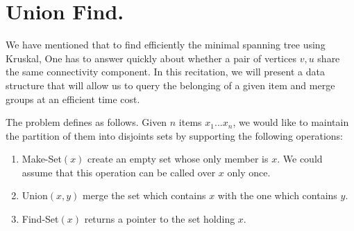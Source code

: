   \pagestyle{empty}

  \setlength{\textwidth}{6.5in}
  \setlength{\evensidemargin}{0.0in}
  \setlength{\oddsidemargin}{0.0in}
  \setlength{\topmargin}{-0.25in}
  \setlength{\textheight}{9.0in}
  \setlength{\baselineskip}{1.3\baselineskip}
  \setlength{\parindent}{.0in}
\fi
{}

\def\LinkedList#1{%
  \foreach \element in \list {
    \node[node of list, right = of aux, name=ele] {\element};
    \draw[link] (aux) -- (ele);
    \coordinate (aux) at (ele.east);
  } 
}








\section{Union Find.} 

We have mentioned that to find efficiently the minimal spanning tree using Kruskal, One has to answer quickly about whether a pair of vertices $v,u$ share the same connectivity component. In this recitation, we will present a data structure that will allow us to query the belonging of a given item and merge groups at an efficient time cost. 

The problem defines as follows. Given $n$ items $x_1 ... x_{n}$, we would like to maintain the partition of them into disjoints sets by supporting the following operations:  
\begin{enumerate}
  \item Make-Set$(x)$ create an empty set whose only member is $x$. We could assume that this operation can be called over $x$ only once. 
  \item Union$(x,y)$ merge the set which contains $x$ with the one which contains $y$. 
  \item Find-Set$(x)$ returns a pointer to the set holding $x$. 
\end{enumerate}

